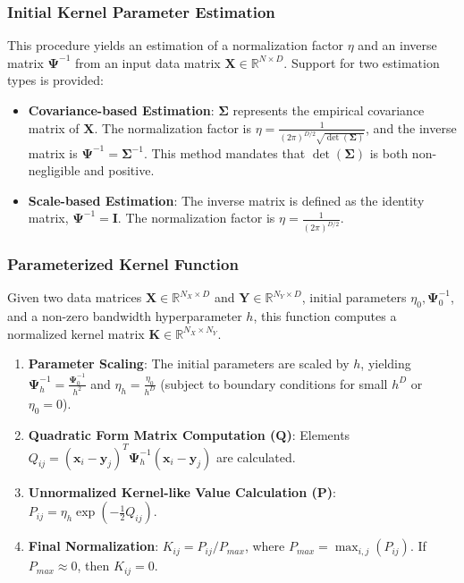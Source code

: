\documentclass[conference]{IEEEtran}
\newcommand{\mat}[1]{\mathbf{#1}} %
\newcommand{\vecbf}[1]{\bm{#1}} %
\begin{document}
\subsubsection{Initial Kernel Parameter Estimation}
This procedure yields an estimation of a normalization factor \(\eta\) and an inverse matrix \(\mat{\Psi}^{-1}\) from an input data matrix \(\mat{X} \in \mathbb{R}^{N \times D}\). Support for two estimation types is provided:
\begin{itemize}
    \item \textbf{Covariance-based Estimation}: \(\mat{\Sigma}\) represents the empirical covariance matrix of \(\mat{X}\). The normalization factor is \(\eta = \frac{1}{(2\pi)^{D/2} \sqrt{\det(\mat{\Sigma})}}\), and the inverse matrix is \(\mat{\Psi}^{-1} = \mat{\Sigma}^{-1}\). This method mandates that \(\det(\mat{\Sigma})\) is both non-negligible and positive.
    \item \textbf{Scale-based Estimation}: The inverse matrix is defined as the identity matrix, \(\mat{\Psi}^{-1} = \mat{I}\). The normalization factor is \(\eta = \frac{1}{(2\pi)^{D/2}}\).
\end{itemize}

\subsubsection{Parameterized Kernel Function}
Given two data matrices \(\mat{X} \in \mathbb{R}^{N_X \times D}\) and \(\mat{Y} \in \mathbb{R}^{N_Y \times D}\), initial parameters \(\eta_0, \mat{\Psi}^{-1}_0\), and a non-zero bandwidth hyperparameter \(h\), this function computes a normalized kernel matrix \(\mat{K} \in \mathbb{R}^{N_X \times N_Y}\).
\begin{enumerate}
    \item \textbf{Parameter Scaling}: The initial parameters are scaled by \(h\), yielding \(\mat{\Psi}^{-1}_h = \frac{\mat{\Psi}^{-1}_0}{h^2}\) and \(\eta_h = \frac{\eta_0}{h^D}\) (subject to boundary conditions for small \(h^D\) or \(\eta_0=0\)).
    \item \textbf{Quadratic Form Matrix Computation (\(\mat{Q}\))}: Elements \(Q_{ij} = (\vecbf{x}_i - \vecbf{y}_j)^T \mat{\Psi}^{-1}_h (\vecbf{x}_i - \vecbf{y}_j)\) are calculated.
    \item \textbf{Unnormalized Kernel-like Value Calculation (\(\mat{P}\))}: \(P_{ij} = \eta_h \exp\left(-\frac{1}{2} Q_{ij}\right)\).
    \item \textbf{Final Normalization}: \(K_{ij} = P_{ij} / P_{max}\), where \(P_{max} = \max_{i,j} (P_{ij})\). If \(P_{max} \approx 0\), then \(K_{ij}=0\).
\end{enumerate}
\end{document}
